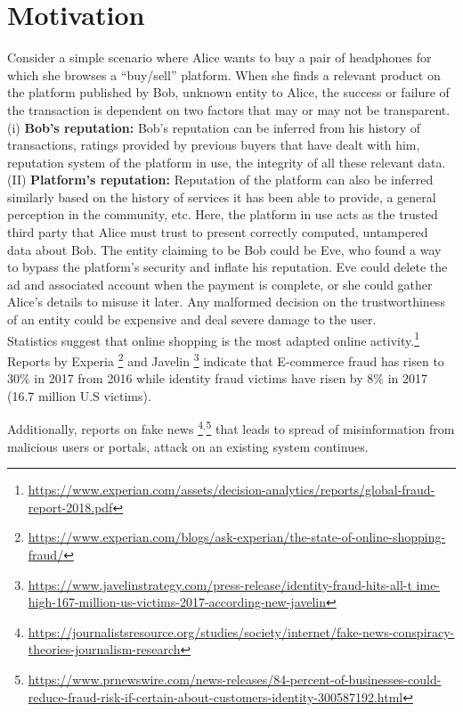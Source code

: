 \section{Motivation}
Consider a simple scenario where Alice wants to buy a pair of headphones for
which she browses a ``buy/sell'' platform. When she finds a relevant product on the
platform published by Bob, unknown entity to Alice, the success or failure of
the transaction is dependent on two factors that may or may not be transparent.\\
(i) \textbf{Bob's reputation:} Bob's reputation can be inferred from his
history of transactions, ratings provided by previous buyers that have dealt
with him, reputation system of the platform in use, the integrity of all these
relevant data. \\
(II) \textbf{Platform's reputation:} Reputation of the platform can also be
inferred similarly based on the history of services it has been able to
provide, a general perception in the community, etc.  Here, the platform in use
acts as the trusted third party that Alice must trust to present correctly
computed, untampered data about Bob. The entity claiming to be Bob could be Eve,
who found a way to bypass the platform's security and inflate his reputation.
Eve could delete the ad and associated account when the payment is complete, or
she could gather Alice's details to misuse it later.  Any malformed decision on
the trustworthiness of an entity could be expensive and deal severe damage to
the user.\\ 
Statistics suggest that online shopping is the most adapted online
activity.\footnote{\url{https://www.experian.com/assets/decision-analytics/reports/global-fraud-report-2018.pdf}}
Reports by Experia
\footnote{\url{https://www.experian.com/blogs/ask-experian/the-state-of-online-shopping-fraud/}}
and Javelin
\footnote{\url{https://www.javelinstrategy.com/press-release/identity-fraud-hits-all-t
ime-high-167-million-us-victims-2017-according-new-javelin}} indicate that
E-commerce fraud has risen to 30\% in 2017 from 2016 while identity fraud
victims have risen by 8\% in 2017 (16.7 million U.S victims). 

Additionally, reports on fake news
\footnote{\url{https://journalistsresource.org/studies/society/internet/fake-news-conspiracy-theories-journalism-research}}$^{,}$\footnote{\url{https://www.prnewswire.com/news-releases/84-percent-of-businesses-could-reduce-fraud-risk-if-certain-about-customers-identity-300587192.html}}
that leads to spread of misinformation from malicious users or portals, attack
on an existing system continues.

